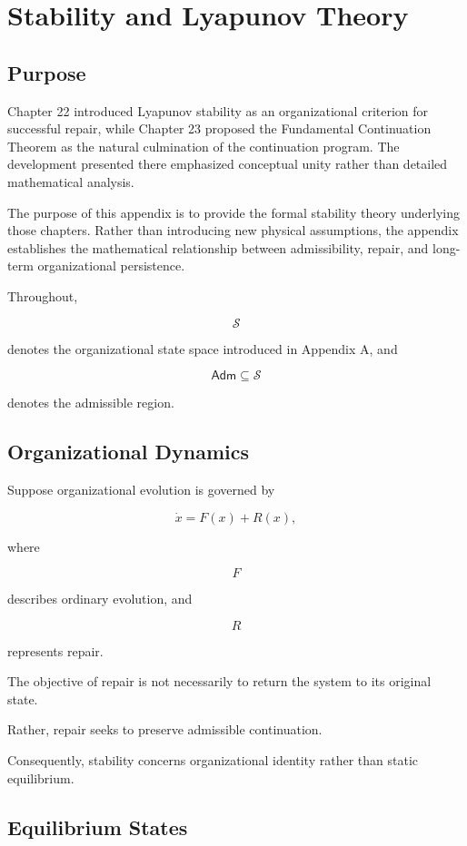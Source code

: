 \documentclass[11pt,oneside]{book}
\numberwithin{equation}{chapter}
\theoremstyle{definition}
\theoremstyle{plain}
\newcommand{\Adm}{\mathsf{Adm}}
\begin{document}
\chapter{Stability and Lyapunov Theory}

\section{Purpose}

Chapter 22 introduced Lyapunov stability as an organizational criterion for
successful repair, while Chapter 23 proposed the Fundamental Continuation
Theorem as the natural culmination of the continuation program. The
development presented there emphasized conceptual unity rather than
detailed mathematical analysis.

The purpose of this appendix is to provide the formal stability theory
underlying those chapters. Rather than introducing new physical
assumptions, the appendix establishes the mathematical relationship
between admissibility, repair, and long-term organizational persistence.

Throughout,

\[
\mathcal S
\]

denotes the organizational state space introduced in Appendix A, and

\[
\Adm
\subseteq
\mathcal S
\]

denotes the admissible region.

\section{Organizational Dynamics}

Suppose organizational evolution is governed by

\[
\dot{x}
=
F(x)
+
R(x),
\]

where

\[
F
\]

describes ordinary evolution, and

\[
R
\]

represents repair.

The objective of repair is not necessarily to return the system to its
original state.

Rather, repair seeks to preserve admissible continuation.

Consequently, stability concerns organizational identity rather than
static equilibrium.

\section{Equilibrium States}
\end{document}
